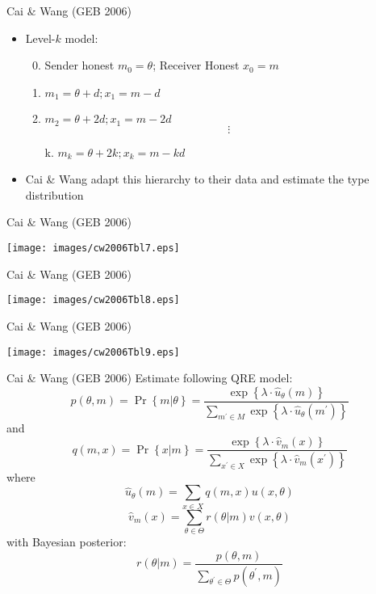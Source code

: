 \documentclass{beamer}
\begin{document}
\begin{frame}{Cai \& Wang (GEB 2006)}
	\begin{itemize}
		\item Level-$k$ model:
		\begin{enumerate}
			\setcounter{enumi}{-1}
			\item Sender honest $m_0=\theta$; Receiver Honest $x_0=m$
			\item $m_1=\theta+d ; x_1=m-d$
			\item $m_2=\theta+2 d ; x_1=m-2 d$
			$$\vdots$$
			\item[k.]  $m_k=\theta+2 k ; x_k=m-k d$
		\end{enumerate}
		\item Cai \& Wang adapt this hierarchy to their data and estimate the type distribution
	\end{itemize}
\end{frame}

\begin{frame}{Cai \& Wang (GEB 2006)}
\begin{center}\texttt{[image: images/cw2006Tbl7.eps]}\end{center}
\end{frame}
\begin{frame}{Cai \& Wang (GEB 2006)}
\begin{center}\texttt{[image: images/cw2006Tbl8.eps]}\end{center}
\end{frame}
\begin{frame}{Cai \& Wang (GEB 2006)}
\begin{center}\texttt{[image: images/cw2006Tbl9.eps]}\end{center}
\end{frame}

\begin{frame}{Cai \& Wang (GEB 2006)}
Estimate following QRE model:
			$$
      p(\theta,m)=\Pr\left\{m\left| \theta\right. \right\}=
      \frac{\exp \left\{\lambda\cdot \hat{u}_\theta(m)\right\}}
      {\sum_{m^\prime\in M}\exp\left\{\lambda\cdot \hat{u}_{\theta}(m^\prime)\right\}}$$
			and
			$$
      q(m,x)=
			\Pr\left\{x\left| m\right. \right\}=
			\frac{\exp\left\{\lambda\cdot \hat{v}_m(x)\right\} }{      \sum_{x^\prime\in X} \exp\left\{\lambda\cdot \hat{v}_{m}(x^\prime)\right\}
      }
      $$
        where
      $$
      \hat{u}_\theta(m)=\sum_{x\in X} q(m,x) u(x,\theta)
      $$
			$$
      \hat{v}_m(x)=\sum_{\theta\in \Theta} r(\theta\left| m\right. ) v(x,\theta )
      $$
			with Bayesian posterior:
			$$
      r(\theta\left| m\right. )=\frac{p(\theta,m)}{\sum_{\theta^\prime\in\Theta} p(\theta^\prime,m)}
      $$

\end{frame}
\end{document}
